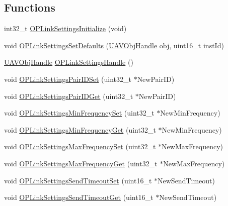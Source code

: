 \subsection*{\-Functions}
\begin{DoxyCompactItemize}
\item 
int32\-\_\-t \hyperlink{group___o_p_link_settings_ga114b65ec58b4825773d3ee4be8f82f6a}{\-O\-P\-Link\-Settings\-Initialize} (void)
\item 
void \hyperlink{group___o_p_link_settings_ga0f3f444ac71994f7698e42916738dacb}{\-O\-P\-Link\-Settings\-Set\-Defaults} (\hyperlink{targets_2_u_a_v_objects_2inc_2uavobjectmanager_8h_a279053e22be53ce9f895043aaeb91e3b}{\-U\-A\-V\-Obj\-Handle} obj, uint16\-\_\-t inst\-Id)
\item 
\hyperlink{targets_2_u_a_v_objects_2inc_2uavobjectmanager_8h_a279053e22be53ce9f895043aaeb91e3b}{\-U\-A\-V\-Obj\-Handle} \hyperlink{group___o_p_link_settings_ga6d567307f84f08a0a54aa372d92611b7}{\-O\-P\-Link\-Settings\-Handle} ()
\item 
void \hyperlink{group___o_p_link_settings_ga33e70675b1e3e59de41670c670fd5498}{\-O\-P\-Link\-Settings\-Pair\-I\-D\-Set} (uint32\-\_\-t $\ast$\-New\-Pair\-I\-D)
\item 
void \hyperlink{group___o_p_link_settings_ga820ad8579a121de84a47ca2f191284e0}{\-O\-P\-Link\-Settings\-Pair\-I\-D\-Get} (uint32\-\_\-t $\ast$\-New\-Pair\-I\-D)
\item 
void \hyperlink{group___o_p_link_settings_ga42fc2d5b22b518b604569de6d4c29704}{\-O\-P\-Link\-Settings\-Min\-Frequency\-Set} (uint32\-\_\-t $\ast$\-New\-Min\-Frequency)
\item 
void \hyperlink{group___o_p_link_settings_ga65ae8234f259e0a20624c5ceb682c35d}{\-O\-P\-Link\-Settings\-Min\-Frequency\-Get} (uint32\-\_\-t $\ast$\-New\-Min\-Frequency)
\item 
void \hyperlink{group___o_p_link_settings_gaa9af45a2585fa5e29c5a395db29ae352}{\-O\-P\-Link\-Settings\-Max\-Frequency\-Set} (uint32\-\_\-t $\ast$\-New\-Max\-Frequency)
\item 
void \hyperlink{group___o_p_link_settings_gaeb6f9c45332ff37ea5d0ab80ce731399}{\-O\-P\-Link\-Settings\-Max\-Frequency\-Get} (uint32\-\_\-t $\ast$\-New\-Max\-Frequency)
\item 
void \hyperlink{group___o_p_link_settings_gabb2e6704b8377a17b17e37a097803b5e}{\-O\-P\-Link\-Settings\-Send\-Timeout\-Set} (uint16\-\_\-t $\ast$\-New\-Send\-Timeout)
\item 
void \hyperlink{group___o_p_link_settings_ga5da1982758abfff9a598fb03496ddc7c}{\-O\-P\-Link\-Settings\-Send\-Timeout\-Get} (uint16\-\_\-t $\ast$\-New\-Send\-Timeout)

\end{DoxyCompactItemize}
